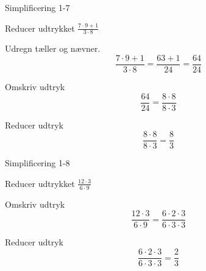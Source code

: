 \documentclass{article}
\begin{document}
\begin{exercise}{Simplificering 1-7}

Reducer udtrykket $\frac{7 \cdot 9 + 1}{3 \cdot 8}$


\hint

Udregn tæller og nævner.
\[
\frac{7 \cdot 9 + 1}{3 \cdot 8} = \frac{63 + 1}{24} = \frac{64}{24}
\]

\hint

Omskriv udtryk
\[
\frac{64}{24} = \frac{8 \cdot 8}{8 \cdot 3}
\]

\hint

Reducer udtryk
\[
\frac{8 \cdot 8}{8 \cdot 3} = \frac{8}{3}
\]

\end{exercise}

\newpage

\begin{exercise}{Simplificering 1-8}

Reducer udtrykket $\frac{12 \cdot 3}{6 \cdot 9}$


\hint

Omskriv udtryk
\[
\frac{12 \cdot 3}{6 \cdot 9} = \frac{6 \cdot 2 \cdot 3}{ 6 \cdot 3 \cdot 3}
\]

\hint

Reducer udtryk
\[
\frac{6 \cdot 2 \cdot 3}{6 \cdot 3 \cdot 3} = \frac{2}{3}
\]

\end{exercise}
\end{document}
